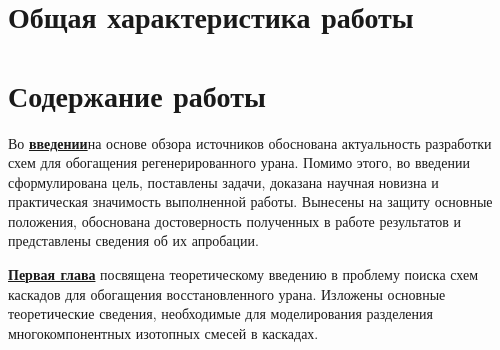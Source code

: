 \section*{Общая характеристика работы}

\newcommand{\actuality}{\underline{\textbf{\actualityTXT}}}
\newcommand{\progress}{\underline{\textbf{\progressTXT}}}
\newcommand{\aim}{\underline{{\textbf\aimTXT}}}
\newcommand{\tasks}{\underline{\textbf{\tasksTXT}}}
\newcommand{\novelty}{\underline{\textbf{\noveltyTXT}}}
\newcommand{\influence}{\underline{\textbf{\influenceTXT}}}
\newcommand{\methods}{\underline{\textbf{\methodsTXT}}}
\newcommand{\defpositions}{\underline{\textbf{\defpositionsTXT}}}
\newcommand{\reliability}{\underline{\textbf{\reliabilityTXT}}}
\newcommand{\probation}{\underline{\textbf{\probationTXT}}}
\newcommand{\contribution}{\underline{\textbf{\contributionTXT}}}
\newcommand{\publications}{\underline{\textbf{\publicationsTXT}}}




\section*{Содержание работы}
Во \underline{\textbf{введении}}на основе обзора источников обоснована актуальность разработки схем для обогащения регенерированного урана. Помимо этого, во введении сформулирована цель, поставлены задачи, доказана научная новизна и практическая значимость выполненной работы. Вынесены на защиту основные положения, обоснована достоверность полученных в работе результатов и представлены сведения об их апробации.


\underline{\textbf{Первая глава}} посвящена теоретическому введению в проблему поиска схем каскадов для обогащения восстановленного урана. Изложены основные теоретические сведения, необходимые для моделирования разделения многокомпонентных изотопных смесей в каскадах.

